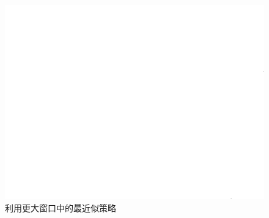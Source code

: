 \documentclass[UTF8]{ctexart}
\begin{document}
\begin{sloppypar}
\begin{figure}[htbp]
\begin{minipage}[t]{0.3\linewidth}
                \includegraphics[width=0.9\linewidth]{figure/result_colorized_allergin_minw}
                \caption{\small 利用更大窗口中的最近似策略}
                \label{fig:colorize:minw}
            \end{minipage}
        \end{figure}\par

\end{sloppypar}
\end{document}

